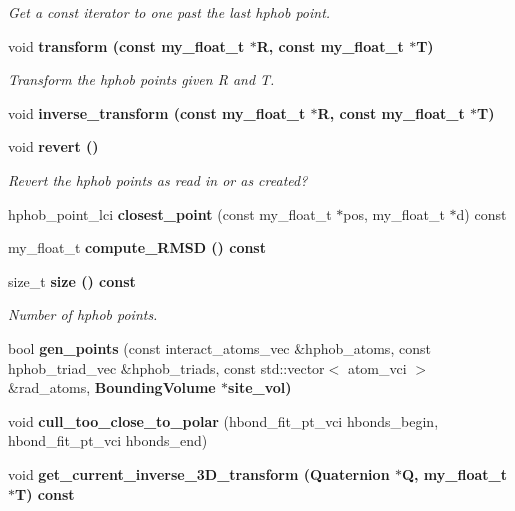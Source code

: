 \begin{CompactItemize}
\begin{CompactList}\small\item\em Get a const iterator to one past the last hphob point. \item\end{CompactList}\item 
void \bf{transform} (const my\_\-float\_\-t $\ast$R, const my\_\-float\_\-t $\ast$T)\label{classSimSite3D_1_1HphobPoints_1dbaaf75ee974e4153e58d4ad0d4abd3}

\begin{CompactList}\small\item\em Transform the hphob points given R and T. \item\end{CompactList}\item 
void \bf{inverse\_\-transform} (const my\_\-float\_\-t $\ast$R, const my\_\-float\_\-t $\ast$T)
\item 
void \bf{revert} ()\label{classSimSite3D_1_1HphobPoints_65c9e7ac92b005e6c0fc1e9995b94351}

\begin{CompactList}\small\item\em Revert the hphob points as read in or as created? \item\end{CompactList}\item 
hphob\_\-point\_\-lci \textbf{closest\_\-point} (const my\_\-float\_\-t $\ast$pos, my\_\-float\_\-t $\ast$d) const \label{classSimSite3D_1_1HphobPoints_3ccf4d89489adac1124e765a9493b604}

\item 
my\_\-float\_\-t \bf{compute\_\-RMSD} () const 
\item 
size\_\-t \bf{size} () const 
\begin{CompactList}\small\item\em Number of hphob points. \item\end{CompactList}\item 
bool \textbf{gen\_\-points} (const interact\_\-atoms\_\-vec \&hphob\_\-atoms, const hphob\_\-triad\_\-vec \&hphob\_\-triads, const std::vector$<$ atom\_\-vci $>$ \&rad\_\-atoms, \bf{Bounding\-Volume} $\ast$site\_\-vol)\label{classSimSite3D_1_1HphobPoints_09a7d1b1f0b101a6adbfa39e8cac7c6e}

\item 
void \textbf{cull\_\-too\_\-close\_\-to\_\-polar} (hbond\_\-fit\_\-pt\_\-vci hbonds\_\-begin, hbond\_\-fit\_\-pt\_\-vci hbonds\_\-end)\label{classSimSite3D_1_1HphobPoints_6ab0f4ed3f5b7ae8b84288b71ebc8311}

\item 
void \bf{get\_\-current\_\-inverse\_\-3D\_\-transform} (Quaternion $\ast$Q, my\_\-float\_\-t $\ast$T) const 
\end{CompactItemize}
